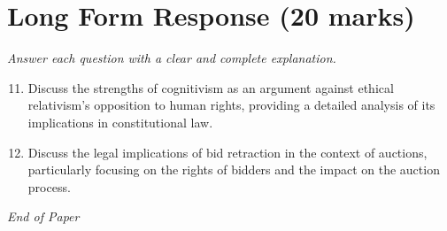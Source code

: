 \documentclass[12pt]{article}
\begin{document}
\section*{Long Form Response (20 marks)}
\textit{Answer each question with a clear and complete explanation.}
\begin{enumerate}[label=\arabic*.]
\setcounter{enumi}{10}
\item Discuss the strengths of cognitivism as an argument against ethical relativism's opposition to human rights, providing a detailed analysis of its implications in constitutional law.
\item Discuss the legal implications of bid retraction in the context of auctions, particularly focusing on the rights of bidders and the impact on the auction process.
\end{enumerate}

\vfill
\noindent\textit{End of Paper}
\end{document}
